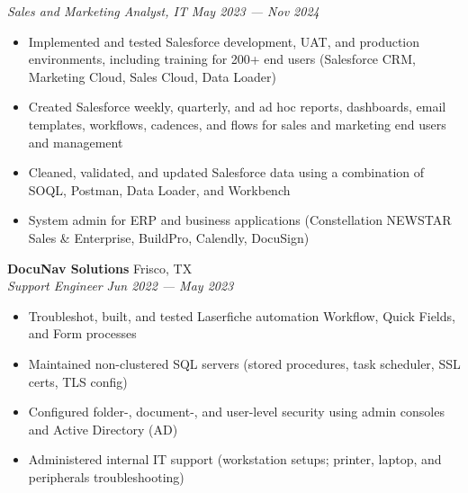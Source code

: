\documentclass[a4paper,11pt]{article}
\begin{document}
\textit{Sales and Marketing Analyst, IT} \hfill  \textit{May 2023 --- Nov 2024} \\
\begin{itemize}
    \item Implemented and tested Salesforce development, UAT, and production environments, including training for 200+ end users (Salesforce CRM, Marketing Cloud, Sales Cloud, Data Loader) 
    \item Created Salesforce weekly, quarterly, and ad hoc reports, dashboards, email templates, workflows, cadences, and flows for sales and marketing end users and management
    \item Cleaned, validated, and updated Salesforce data using a combination of SOQL, Postman, Data Loader, and Workbench
    \item System admin for ERP and business applications (Constellation NEWSTAR Sales \& Enterprise, BuildPro, Calendly, DocuSign)
\end{itemize}
\vspace{0.5mm}

\textbf{DocuNav Solutions} \hfill Frisco, TX \\
\textit{Support Engineer} \hfill  \textit{Jun 2022 --- May 2023} \\
\begin{itemize}
    \item Troubleshot, built, and tested Laserfiche automation Workflow, Quick Fields, and Form processes
    \item Maintained non-clustered SQL servers (stored procedures, task scheduler, SSL certs, TLS config)
    \item Configured folder-, document-, and user-level security using admin consoles and Active Directory (AD)
    \item Administered internal IT support (workstation setups; printer, laptop, and peripherals troubleshooting)
\end{itemize}    
\vspace{0.5mm}

\end{document}
